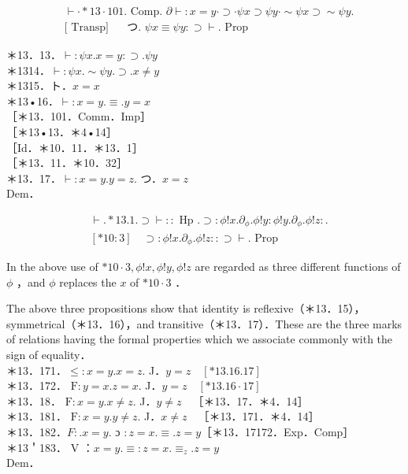 \documentclass[10pt]{article}
\begin{document}
$$
\begin{aligned}
& \vdash \cdot * 13 \cdot 101 \text {. Comp. } \partial \vdash: x=y \cdot \supset \cdot \psi x \supset \psi y \cdot \sim \psi x \supset \sim \psi y . \\
& {[\text { Transp] } \quad \text { つ. } \psi x \equiv \psi y: \supset \vdash . \text { Prop }}
\end{aligned}
$$

＊13．13．$\vdash: \psi x . x=y: \supset . \psi y$\\
＊1314．$\vdash: \psi x . \sim \psi y . \supset . x \neq y$\\
＊1315．ト．$x=x$\\
＊13•16．$\vdash: x=y . \equiv . y=x$\\
［＊13．101．Comm．Imp］\\
［＊13•13．＊4•14］\\
［Id．＊10．11．＊13．1］\\
［＊13．11．＊10．32］\\
＊13．17．$\vdash: x=y . y=z$. つ．$x=z$\\
Dem．

$$
\begin{aligned}
& \vdash . * 13.1 . \supset \vdash:: \text { Hp } . \supset: \phi!x . \partial_{\phi} . \phi!y: \phi!y . \partial_{\phi} . \phi!z: . \\
& {[* 10: 3] \quad \supset: \phi!x . \partial_{\phi} . \phi!z:: \supset \vdash . \text { Prop }}
\end{aligned}
$$

In the above use of $* 10 \cdot 3, \phi!x, \phi!y, \phi!z$ are regarded as three different functions of $\phi$ ，and $\phi$ replaces the $x$ of $* 10 \cdot 3$ ．

The above three propositions show that identity is reflexive（＊13．15）， symmetrical（＊13．16），and transitive（＊13．17）．These are the three marks of relations having the formal properties which we associate commonly with the sign of equality．\\
＊13．171．$\leqslant: x=y . x=z$. J．$y=z \quad[* 13.16 .17]$\\
＊13．172． $\mathrm{F}: y=x . z=x$. J．$y=z \quad[* 13.16 \cdot 17]$\\
＊13．18． $\mathrm{F}: x=y . x \neq z$. J．$y \neq z \quad$［＊13．17．＊4．14］\\
＊13．181． $\mathrm{F}: x=y . y \neq z$. J．$x \neq z \quad$［＊13．171．＊4．14］\\
＊13．182．$F: . x=y$. ɔ $: z=x . \equiv . z=y$［＊13．17172．Exp．Comp］\\
＊13＇183． V ：$x=y . \equiv: z=x . \equiv_{z} . z=y$\\
Dem．
\end{document}
